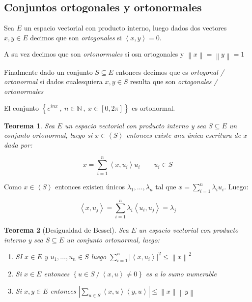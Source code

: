 \documentclass[11pt]{article}
\newcommand{\N}{{\mathbb{N}}}
\newcommand{\norm}[1]{\left\lVert#1\right\rVert}
\newcommand{\abs}[1]{\left\lvert#1\right\rvert}
\newcommand{\ip}[1]{\left\langle#1\right\rangle}
\newcommand{\sett}[1]{\left\lbrace#1\right\rbrace}
\newcommand{\Bigsum}[2]{\sum\limits_{#1}{#2}}
\newtheorem{theorem}{Teorema}
\numberwithin{theorem}{subsection}
\newenvironment{proof}[1][Demostraci\'on]{\begin{trivlist}
		\item[\hskip \labelsep {\bfseries #1}]}{\end{trivlist}}
\newenvironment{definition}[1][Definici\'on]{\begin{trivlist}
		\item[\hskip \labelsep {\bfseries #1}]}{\end{trivlist}}
\newenvironment{example}[1][Ejemplo]{\begin{trivlist}
		\item[\hskip \labelsep {\bfseries #1 }]}{\end{trivlist}}
\newcommand{\qed}{\nobreak \ifvmode \relax \else
	\ifdim\lastskip<1.5em \hskip-\lastskip
	\hskip1.5em plus0em minus0.5em \fi \nobreak
	\vrule height0.75em width0.5em depth0.25em\fi}
\begin{document}
\subsection{Conjuntos ortogonales y ortonormales}

\begin{definition}
	Sea $E$ un espacio vectorial con producto interno, luego dados dos vectores $x,y \in E$ decimos que son \textit{ortogonales} si $\ip{x,y} = 0$.
	
	A su vez decimos que son \textit{ortonormales} si osn ortogonales y $\norm{x} = \norm{y} = 1$
	
	Finalmente dado un conjunto $S \subseteq E$ entonces decimos que es \textit{ortogonal / ortonormal} si dados cualesquiera $x,y \in S$ resulta que son \textit{ortogonales / ortonormales} 
\end{definition}

\begin{example}
	El conjunto $\sett{e^{inx} \ , \ n \in \N \ , \ x \in [0,2 \pi]}$ es ortonormal.
\end{example}

\begin{theorem}
	\label{Escritura de proyeccion a un conjunto ortonormal}
	Sea $E$ un espacio vectorial con producto interno y sea $S \subseteq E$ un conjunto ortonormal, luego si $x \in \ip{S}$ entonces existe una \'unica escritura de $x$ dada por:
	
	$$x = \sum\limits_{i = 1}^{n}{\ip{x,u_i}u_i} \qquad u_i \in S$$
	
\end{theorem}

\begin{proof}
	Como $x \in \ip{S}$ entonces existen \'unicos $\lambda_{1},\dots, \lambda_{n}$ tal que $x = \sum\limits_{i = 1}^{n}{\lambda_i u_i}$. Luego:
	
	
	\[
		\ip{x,u_j} = \sum\limits_{i = 1}^{n}{\lambda_i \ip{u_i,u_j}} = \lambda_j
	\]
	\qed
\end{proof}

\begin{theorem}[Desigualdad de Bessel]
	\label{Desigualdad de Bessel}
	Sea $E$ un espacio vectorial con producto interno y sea $S \subseteq E$ un conjunto ortonormal, luego:
	
	\begin{enumerate}
		\item SI $x \in E$ y $u_1, \dots, u_n \in S$ luego $\sum\limits_{i = 1}^{n}{\abs{\ip{x,u_i}}^2} \leq \norm{x}^2$
		\item Si $x \in E$ entonces $\sett{u \in S \ / \ \ip{x,u}\neq 0}$ es a lo sumo numerable
		\item Si $x,y \in E$ entonces $\abs{\Bigsum{u \in S}{\ip{x,u}\overline{\ip{y,u}}}} \leq \norm{x}\norm{y}$
	\end{enumerate}
\end{theorem}
\end{document}
